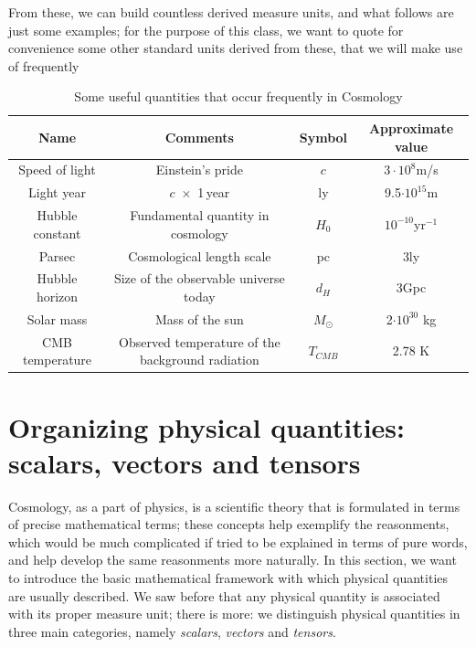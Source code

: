 \documentclass[11pt, a4paper,oneside,openright]{book}
\numberwithin{equation}{section}
\begin{document}
\noindent From these, we can build countless derived measure units, and what follows are just some examples; for the purpose of this class, we want to quote for convenience some other standard units derived from these, that we will make use of frequently
\begin{table}[htdp]
\begin{center}
\begin{tabular}{|c|c|c|c|} \hline
\textbf{Name} & \textbf{Comments} & \textbf{Symbol} & \textbf{Approximate value} \\ \hline
Speed of light &Einstein's pride & $c$ & $3\cdot 10^8$m/s \\ \hline
Light year &$c\,\,\times$ 1\,year& ly & 9.5$\cdot10^{15}$m\\ \hline
Hubble constant &Fundamental quantity in cosmology&$H_0$&$10^{-10}$yr$^{-1}$\\ \hline
Parsec &Cosmological length scale& pc & 3ly \\ \hline
Hubble horizon &Size of the observable universe today& $d_H$&3Gpc\\ \hline 
Solar mass & Mass of the sun & $M_\odot$ & 2$\cdot10^{30}$ kg\\ \hline
CMB temperature &Observed temperature of the background radiation&$T_{CMB}$&2.78 K \\ \hline 

\end{tabular}
\end{center}
\caption{Some useful quantities that occur frequently in Cosmology}
\end{table}

\section{Organizing physical quantities: scalars, vectors and tensors}
Cosmology, as a part of physics, is a scientific theory that is formulated in terms of precise mathematical terms; these concepts help exemplify the reasonments, which would be much complicated if tried to be explained in terms of pure words, and help develop the same reasonments more naturally. In this section, we want to introduce the basic mathematical framework with which physical quantities are usually described. We saw before that any physical quantity is associated with its proper measure unit; there is more: we distinguish physical quantities in three main categories, namely \textit{scalars}, \textit{vectors} and \textit{tensors}. 
\end{document}
